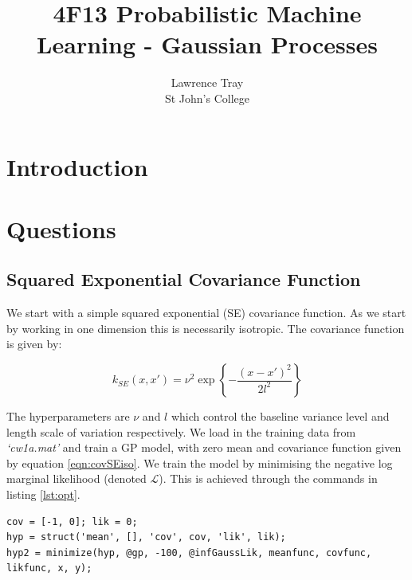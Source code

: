 \documentclass[]{article}
\title{4F13 Probabilistic Machine Learning - Gaussian Processes}
\author{Lawrence Tray \\ St John's College}
\newcommand{\Lcal}{\mathcal{L}}
\begin{document}
\maketitle

\begin{abstract}
\end{abstract}

\section{Introduction}

\section{Questions}
\subsection{Squared Exponential Covariance Function}

We start with a simple squared exponential (SE) covariance function. As we start by working in one dimension this is necessarily isotropic. The covariance function is given by:

\begin{equation}
k_{SE}(x, x') = \nu^2 \exp\left\{- \frac{(x-x')^2}{2l^2}\right\}
\label{eqn:covSEiso}
\end{equation}

The hyperparameters are $\nu$ and $l$ which control the baseline variance level and length scale of variation respectively. We load in the training data from \textit{`cw1a.mat'} and train a GP model, with zero mean and covariance function given by equation \ref{eqn:covSEiso}. We train the model by minimising the negative log marginal likelihood (denoted $\Lcal$). This is achieved through the commands in listing \ref{lst:opt}.

\begin{lstlisting}[frame=single, caption={Hyperparameter optimisation}, label={lst:opt}]
cov = [-1, 0]; lik = 0;
hyp = struct('mean', [], 'cov', cov, 'lik', lik);
hyp2 = minimize(hyp, @gp, -100, @infGaussLik, meanfunc, covfunc, likfunc, x, y);
\end{lstlisting}
\end{document}
